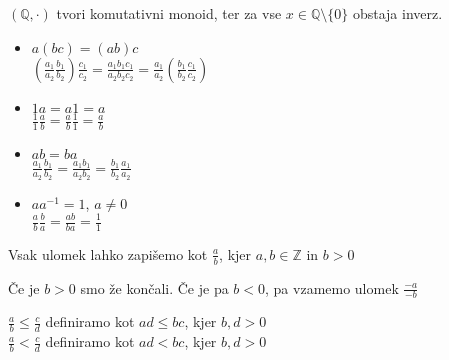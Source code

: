 \begin{trditev}
    $(\mathbb{Q}, \cdot)$ tvori komutativni monoid, ter za vse $x \in \mathbb{Q} \setminus \{0\}$ obstaja inverz.
\end{trditev}
\begin{dokaz}
    \begin{itemize}
        \item $a(bc) = (ab)c$ \\
        $\left(\frac{a_1}{a_2} \frac{b_1}{b_2}\right) \frac{c_1}{c_2} = \frac{a_1 b_1 c_1}{a_2 b_2 c_2} = \frac{a_1}{a_2} \left(\frac{b_1}{b_2} \frac{c_1}{c_2}\right)$
        \item $1a = a1 = a$ \\
        $\frac{1}{1} \frac{a}{b} = \frac{a}{b} \frac{1}{1} = \frac{a}{b}$
        \item $ab = ba$ \\
        $\frac{a_1}{a_2} \frac{b_1}{b_2} = \frac{a_1 b_1}{a_2 b_2} = \frac{b_1}{b_2} \frac{a_1}{a_2}$
        \item $a a^{-1} = 1$, $a \neq 0$ \\
        $\frac{a}{b} \frac{b}{a} = \frac{ab}{ba} = \frac{1}{1}$
    \end{itemize}
\end{dokaz}

\begin{trditev}
    Vsak ulomek lahko zapišemo kot $\frac{a}{b}$, kjer $a,b \in \mathbb{Z}$ in $b > 0$
\end{trditev}
\begin{dokaz}
    Če je $b > 0$ smo že končali.
    Če je pa $b < 0$, pa vzamemo ulomek $\frac{-a}{-b}$
\end{dokaz}

\begin{definicija}
    $\frac{a}{b} \leq \frac{c}{d}$ definiramo kot $ad \leq bc$, kjer $b, d > 0$ \\
    $\frac{a}{b} < \frac{c}{d}$ definiramo kot $ad < bc$, kjer $b, d > 0$
\end{definicija}
